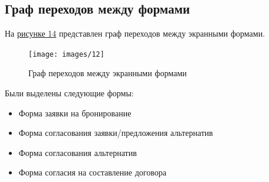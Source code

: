 \documentclass[12pt,a4paper,final]{article} %
\begin{document}
\subsection{Граф переходов между формами}
\par На \hyperref[fig:im14]{рисунке 14} представлен граф переходов между экранными формами. 
\begin{figure}[h!]
	\centering
	\texttt{[image: images/12]}
	\caption{Граф переходов между экранными формами}
	\label{fig:im14}
\end{figure}	

\par Были выделены следующие формы:
\begin{itemize}
	\item Форма заявки на бронирование
	\item Форма согласования заявки/предложения альтернатив
	\item Форма согласования альтернатив
	\item Форма согласия на составление договора
\end{itemize}
\end{document}
